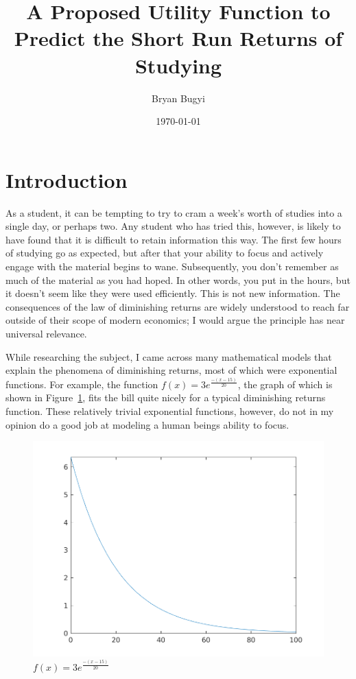 \documentclass[12pt]{article}
\title{A Proposed Utility Function to Predict the Short Run Returns of Studying}
\author{Bryan Bugyi}
\date{\today}
\begin{document}
    \maketitle

    \section{Introduction}
    As a student, it can be tempting to try to cram a week's worth of studies into a single day, or perhaps two. Any student who has tried this, however, is likely to have found that it is difficult to retain information this way. The first few hours of studying go as expected, but after that your ability to focus and actively engage with the material begins to wane. Subsequently, you don't remember as much of the material as you had hoped. In other words, you put in the hours, but it doesn't seem like they were used efficiently. This is not new information. The consequences of the law of diminishing returns are widely understood to reach far outside of their scope of modern economics; I would argue the principle has near universal relevance.
    
    While researching the subject, I came across many mathematical models that explain the phenomena of diminishing returns, most of which were exponential functions. For example, the function $f(x) = 3e^{\frac{-(x-15)}{20}}$, the graph of which is shown in Figure~\ref{Fig:Triv}, fits the bill quite nicely for a typical diminishing returns function. These relatively trivial exponential functions, however, do not in my opinion do a good job at modeling a human beings ability to focus.
    

    \begin{figure}[Htb]
        \begin{center}
            \caption{$f(x) = 3e^{\frac{-(x-15)}{20}}$} \label{Fig:Triv}
            \includegraphics[scale=.5]{TrivialDimReturns.png}
        \end{center}
    \end{figure}
\end{document}
